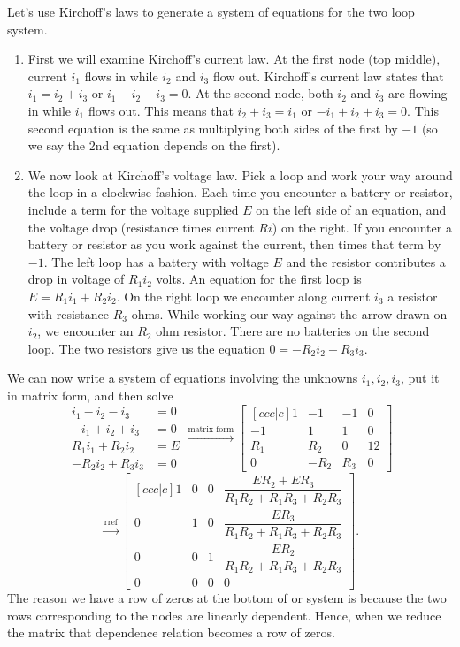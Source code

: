 Let's use Kirchoff's laws to generate a system of equations for the two loop system. 
\begin{enumerate}
	\item First we will examine Kirchoff's current law. At the first node (top middle), current $i_1$ flows in while $i_2$ and $i_3$ flow out. Kirchoff's current law states that $i_1=i_2+i_3$ or $i_1-i_2-i_3=0$.  At the second node, both $i_2$ and $i_3$ are flowing in while $i_1$ flows out. This means that $i_2+i_3=i_1$ or $-i_1+i_2+i_3=0$. This second equation is the same as multiplying both sides of the first by $-1$ (so we say the 2nd equation depends on the first). 
	\item We now look at Kirchoff's voltage law. Pick a loop and work your way around the loop in a clockwise fashion. Each time you encounter a battery or resistor, include a term for the voltage supplied $E$ on the left side of an equation, and the voltage drop (resistance times current $Ri$) on the right. If you encounter a battery or resistor as you work against the current, then times that term by $-1$. The left loop has a battery with voltage $E$ and the resistor contributes a drop in voltage of $R_1 i_2$ volts.  An equation for the first loop is $E=R_1i_1+R_2i_2$. On the right loop we encounter along current $i_3$ a resistor with resistance $R_3$ ohms.  While working our way against the arrow drawn on $i_2$, we encounter an $R_2$ ohm resistor.  There are no batteries on the second loop. The two resistors give us the equation $0=-R_2 i_2 +R_3i_3$. 
\end{enumerate}
We can now write a system of equations involving the unknowns $i_1,i_2,i_3$, put it in matrix form, and then solve
$$
\begin{array}{rl}
i_1-i_2-i_3&=0\\
-i_1+i_2+i_3&=0\\
R_1i_1+R_2i_2&=E\\
-R_2 i_2 +R_3i_3&=0
\end{array}
\xrightarrow{\text{matrix form}}
\begin{bmatrix}[ccc|c]
1&-1&-1&0\\
-1&1&1&0\\
R_1&R_2&0&12\\
0&-R_2&R_3&0
\end{bmatrix}
$$$$
\xrightarrow{\text{rref}}
\begin{bmatrix}[ccc|c]
 1 & 0 & 0 & \dfrac{E R_2+ E R_3}{R_1 R_2+R_1 R_3+R_2R_3} \\
 0 & 1 & 0 & \dfrac{E R_3}{R_1 R_2+R_1 R_3+R_2R_3} \\
 0 & 0 & 1 & \dfrac{E R_2}{R_1 R_2+R_1 R_3+R_2R_3} \\
 0 & 0 & 0 & 0
\end{bmatrix}.
$$
The reason we have a row of zeros at the bottom of or system is because the two rows corresponding to the nodes are linearly dependent.  Hence, when we reduce the matrix that dependence relation becomes a row of zeros.

